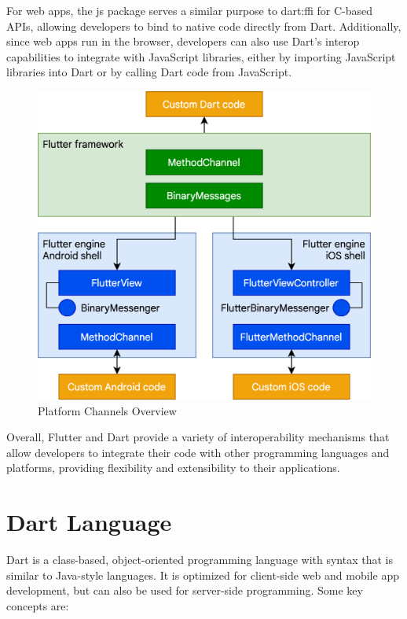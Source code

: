 \documentclass[conference]{IEEEtran}
\begin{document}
For web apps, the js package serves a similar purpose to dart:ffi for C-based APIs, allowing developers to bind to native code directly from Dart. Additionally, since web apps run in the browser, developers can also use Dart's interop capabilities to integrate with JavaScript libraries, either by importing JavaScript libraries into Dart or by calling Dart code from JavaScript.


\begin{figure}[ht]
	\centerline{\includegraphics[width=\linewidth]{figures/platform-channels}}
	\caption{Platform Channels Overview \cite{b1.1}}
	\label{fig:platform-channels}
\end{figure}

Overall, Flutter and Dart provide a variety of interoperability mechanisms that allow developers to integrate their code with other programming languages and platforms, providing flexibility and extensibility to their applications.

\section{Dart Language}

Dart is a class-based, object-oriented programming language with syntax that is similar to Java-style languages. It is optimized for client-side web and mobile app development, but can also be used for server-side programming. Some key concepts are:
\end{document}
